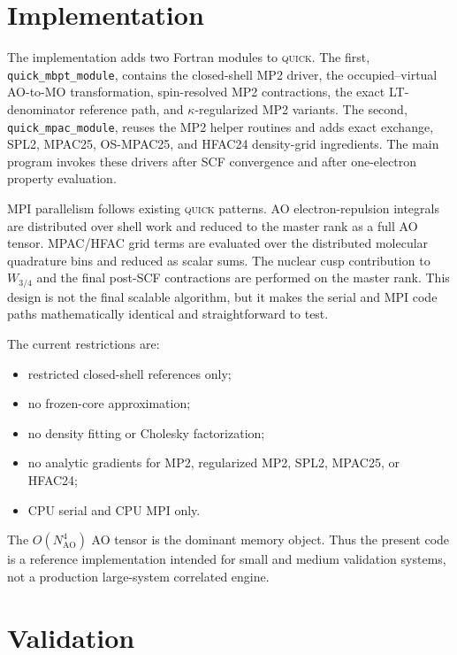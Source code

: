 \documentclass[aip,jcp,reprint,superscriptaddress]{revtex4-2}
\newcommand{\quick}{\textsc{quick}}
\newcommand{\keyword}[1]{\texttt{#1}}
\newcommand{\Wthreeq}{W_{3/4}}
\begin{document}
\section{Implementation}

The implementation adds two Fortran modules to \quick{}.  The first, \keyword{quick\_mbpt\_module}, contains the closed-shell MP2 driver, the occupied--virtual AO-to-MO transformation, spin-resolved MP2 contractions, the exact LT-denominator reference path, and \(\kappa\)-regularized MP2 variants.  The second, \keyword{quick\_mpac\_module}, reuses the MP2 helper routines and adds exact exchange, SPL2, MPAC25, OS-MPAC25, and HFAC24 density-grid ingredients.  The main program invokes these drivers after SCF convergence and after one-electron property evaluation.

MPI parallelism follows existing \quick{} patterns.  AO electron-repulsion integrals are distributed over shell work and reduced to the master rank as a full AO tensor.  MPAC/HFAC grid terms are evaluated over the distributed molecular quadrature bins and reduced as scalar sums.  The nuclear cusp contribution to \(\Wthreeq\) and the final post-SCF contractions are performed on the master rank.  This design is not the final scalable algorithm, but it makes the serial and MPI code paths mathematically identical and straightforward to test.

The current restrictions are:
\begin{itemize}
  \item restricted closed-shell references only;
  \item no frozen-core approximation;
  \item no density fitting or Cholesky factorization;
  \item no analytic gradients for MP2, regularized MP2, SPL2, MPAC25, or HFAC24;
  \item CPU serial and CPU MPI only.
\end{itemize}
The \(O(N_{\mathrm{AO}}^4)\) AO tensor is the dominant memory object.  Thus the present code is a reference implementation intended for small and medium validation systems, not a production large-system correlated engine.

\section{Validation}
\end{document}
